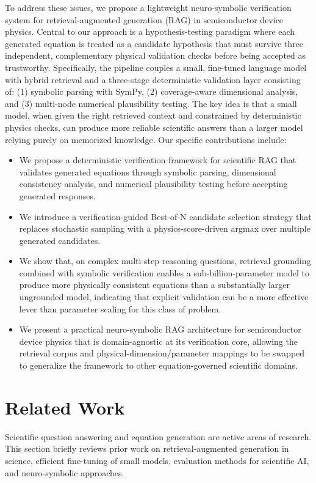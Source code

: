 \documentclass[a4paper,fleqn]{cas-sc}
\begin{document}
To address these issues, we propose a lightweight neuro-symbolic verification system for retrieval-augmented generation (RAG) in semiconductor device physics. Central to our approach is a hypothesis-testing paradigm where each generated equation is treated as a candidate hypothesis that must survive three independent, complementary physical validation checks before being accepted as trustworthy. Specifically, the pipeline couples a small, fine-tuned language model with hybrid retrieval and a three-stage deterministic validation layer consisting of: (1) symbolic parsing with SymPy, (2) coverage-aware dimensional analysis, and (3) multi-node numerical plausibility testing. The key idea is that a small model, when given the right retrieved context and constrained by deterministic physics checks, can produce more reliable scientific answers than a larger model relying purely on memorized knowledge. Our specific contributions include:
\begin{itemize}
\item We propose a deterministic verification framework for scientific RAG that validates generated equations through symbolic parsing, dimensional consistency analysis, and numerical plausibility testing before accepting generated responses.
\item We introduce a verification-guided Best-of-N candidate selection strategy that replaces stochastic sampling with a physics-score-driven argmax over multiple generated candidates.
\item We show that, on complex multi-step reasoning questions, retrieval grounding combined with symbolic verification enables a sub-billion-parameter model to produce more physically consistent equations than a substantially larger ungrounded model, indicating that explicit validation can be a more effective lever than parameter scaling for this class of problem.
\item We present a practical neuro-symbolic RAG architecture for semiconductor device physics that is domain-agnostic at its verification core, allowing the retrieval corpus and physical-dimension/parameter mappings to be swapped to generalize the framework to other equation-governed scientific domains.
\end{itemize}

\section{Related Work}
Scientific question answering and equation generation are active areas of research. This section briefly reviews prior work on retrieval-augmented generation in science, efficient fine-tuning of small models, evaluation methods for scientific AI, and neuro-symbolic approaches.
\end{document}
